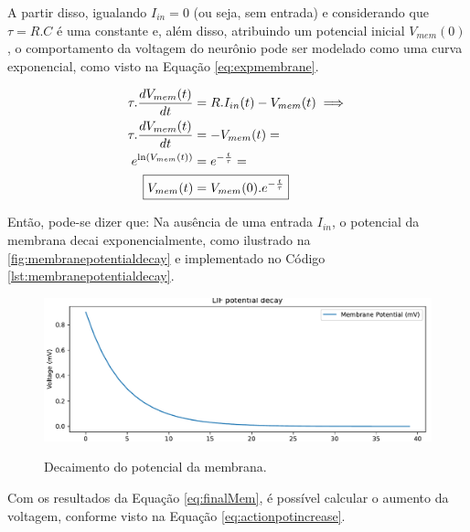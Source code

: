 			\par A partir disso, igualando $I_{in} = 0$ (ou seja, sem entrada) e considerando que $\tau = R.C$ é uma constante e, além disso, atribuindo um potencial inicial $V_{mem}(0)$, o comportamento da voltagem do neurônio pode ser modelado como uma curva exponencial, como visto na Equação \autoref{eq:expmembrane}.
			
			\begin{equation}
				\label{eq:expmembrane}
				\begin{aligned}
					\tau.\dfrac{dV_{mem}(t)}{dt} &= R.I_{in}(t) - V_{mem}(t) \implies \\
					\tau.\dfrac{dV_{mem}(t)}{dt} &= -V_{mem}(t) = \\
					e^{\ln(V_{mem}(t))} &= e^{-\frac{t}{\tau}} = \\
					\Aboxed{V_{mem}(t) &= V_{mem}(0).e^{-\frac{t}{\tau}}}
				\end{aligned}
			\end{equation}
			
			\par Então, pode-se dizer que: Na ausência de uma entrada $I_{in}$, o potencial da membrana decai exponencialmente, como ilustrado na  \autoref{fig:membranepotentialdecay} e implementado no Código \autoref{lst:membranepotentialdecay}.
			
			
			
			\begin{figure}[H]
				\centering
				\caption{Decaimento do potencial da membrana.}
				\includegraphics[width=.7\linewidth]{images/membranePotentialDecay}
				\label{fig:membranepotentialdecay}
			\end{figure}
			
			\par Com os resultados da Equação \autoref{eq:finalMem}, é possível calcular o aumento da voltagem, conforme visto na Equação \autoref{eq:actionpotincrease}.
			
